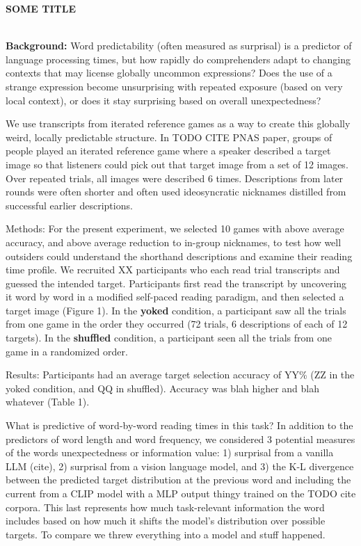 \documentclass[11pt,a4paper]{article}
\renewcommand{\title}[1]{\textbf{#1}\\}
\newcommand{\authors}[1]{\iftoggle{anonymous}{\phantom{#1}}{#1}\\}
\begin{document}

\noindent\title{SOME TITLE}
\authors{Veronica Boyce (vboyce@stanford.edu), Ben Prystawski, Alvin Tan, Michael C. Frank (Stanford University)} 
\newline


\textbf{Background:} Word predictability (often measured as surprisal) is a predictor of language processing times, but how rapidly do comprehenders adapt to changing contexts that may license globally uncommon expressions? Does the use of a strange expression become unsurprising with repeated exposure (based on very local context), or does it stay surprising based on overall unexpectedness? 

We use transcripts from iterated reference games as a way to create this globally weird, locally predictable structure. In TODO CITE PNAS paper, groups of people played an iterated reference game where a speaker described a target image so that listeners could pick out that target image from a set of 12 images. Over repeated trials, all images were described 6 times. Descriptions from later rounds were often shorter and often used ideosyncratic nicknames distilled from successful earlier descriptions. 

Methods: For the present experiment, we selected 10 games with above average accuracy, and above average reduction to in-group nicknames, to test how well outsiders could understand the shorthand descriptions and examine their reading time profile. We recruited XX participants who each read trial transcripts and guessed the intended target. Participants first read the transcript by uncovering it word by word in a modified self-paced reading paradigm, and then selected a target image (Figure 1). In the \textbf{yoked} condition, a participant saw all the trials from one game in the order they occurred (72 trials, 6 descriptions of each of 12 targets). In the \textbf{shuffled} condition, a participant seen all the trials from one game in a randomized order. 

Results: Participants had an average target selection accuracy of YY\% (ZZ in the yoked condition, and QQ in shuffled). Accuracy was blah higher and blah whatever (Table 1). 

What is predictive of word-by-word reading times in this task? In addition to the predictors of word length and word frequency, we considered 3 potential measures of the words unexpectedness or information value: 1) surprisal from a vanilla LLM (cite), 2) surprisal from a vision language model, and 3) the K-L divergence between the predicted target distribution at the previous word and including the current from a CLIP model with a MLP output thingy trained on the TODO cite corpora. This last represents how much task-relevant information the word includes based on how much it shifts the model's distribution over possible targets. 
To compare we threw everything into a model and stuff happened. 
\end{document}
